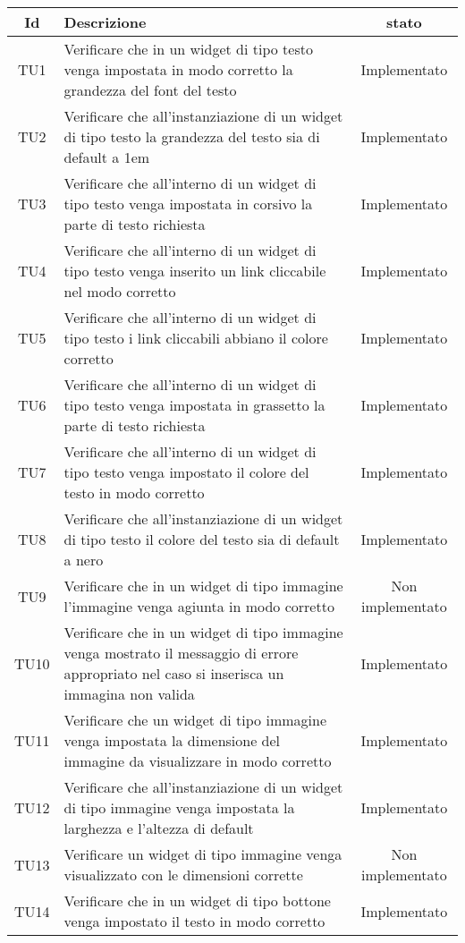 \begin{center}
	\begin{longtable}{|c|>{\centering}m{10cm}|c|}\hline
		Id & Descrizione & stato \\ \hline
		TU1 & Verificare che in un widget di tipo testo venga impostata in modo corretto la grandezza del font del testo & Implementato \\ \hline
		TU2 & Verificare che all'instanziazione di un widget di tipo testo la grandezza del testo sia di default a 1em & Implementato \\ \hline
		TU3 & Verificare che all'interno di un widget di tipo testo venga impostata in corsivo la parte di testo richiesta & Implementato \\ \hline
		TU4 & Verificare che all'interno di un widget di tipo testo venga inserito un link cliccabile nel modo corretto & Implementato \\ \hline
		TU5 & Verificare che all'interno di un widget di tipo testo i link cliccabili abbiano il colore corretto & Implementato \\ \hline
		TU6 & Verificare che all'interno di un widget di tipo testo venga impostata in grassetto la parte di testo richiesta & Implementato \\ \hline
		TU7 & Verificare che all'interno di un widget di tipo testo venga impostato il colore del testo in modo corretto & Implementato \\ \hline
		TU8 & Verificare che all'instanziazione di un widget di tipo testo il colore del testo sia di default a nero & Implementato \\ \hline
		TU9 & Verificare che in un widget di tipo immagine l'immagine venga agiunta in modo corretto & Non implementato \\ \hline
		TU10 & Verificare che in un widget di tipo immagine venga mostrato il messaggio di errore appropriato nel caso si inserisca un immagina non valida & Implementato \\ \hline
		TU11 & Verificare che un widget di tipo immagine venga impostata la dimensione del immagine da visualizzare in modo corretto & Implementato \\ \hline
		TU12 & Verificare che all'instanziazione di un widget di tipo immagine venga impostata la larghezza e l'altezza di default & Implementato \\ \hline
		TU13 & Verificare un widget di tipo immagine venga visualizzato con le dimensioni corrette & Non implementato \\ \hline
		TU14 & Verificare che in un widget di tipo bottone venga impostato il testo in modo corretto & Implementato \\ \hline

\end{longtable}
\end{center}
